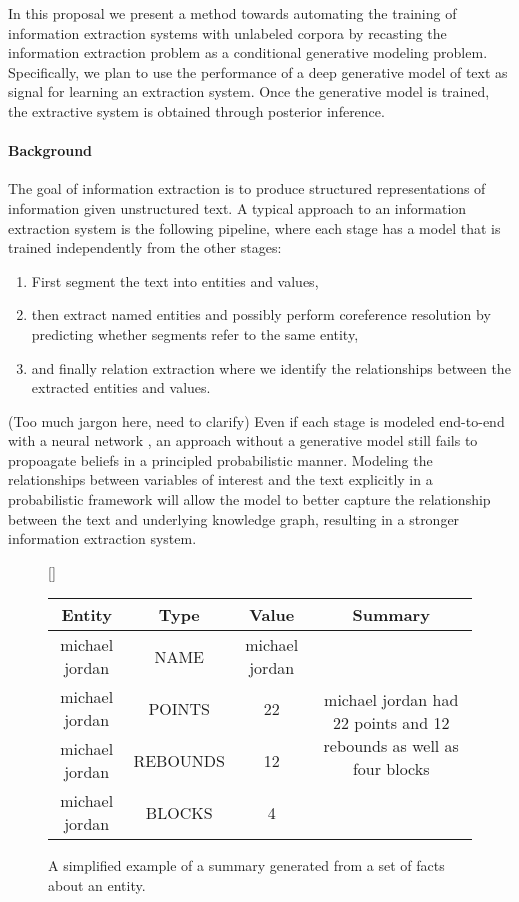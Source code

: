 \documentclass[12pt]{article}
\begin{document}
In this proposal we present a method towards automating the
training of information extraction systems with unlabeled corpora
by recasting the information extraction problem as a conditional generative modeling problem.
Specifically, we plan to use the performance of a deep generative model of text 
as signal for learning an extraction system.
Once the generative model is trained, the extractive system is obtained through posterior inference.

\paragraph{Background}
The goal of information extraction is to produce structured representations of information
given unstructured text.
A typical approach to an information extraction system is the following pipeline,
where each stage has a model that is trained independently from the other stages:
\begin{enumerate}
\item First segment the text into entities and values,
\item then extract named entities and possibly perform
coreference resolution by predicting whether segments refer to the same entity, 
\item and finally relation extraction where we identify the relationships between the extracted
entities and values.
\end{enumerate}
(Too much jargon here, need to clarify)
Even if each stage is modeled end-to-end with a neural network \citep{miwa2016e2ere},
an approach without a generative model still fails to propoagate beliefs
in a principled probabilistic manner.
Modeling the relationships between variables of interest and the text explicitly in a probabilistic framework
will allow the model to better capture
the relationship between the text and underlying knowledge graph,
resulting in a stronger information extraction system.

\begin{figure}[t]
\centering
{}[\FBwidth]
{\caption{A simplified example of a summary generated from a set of facts about an entity.}
\label{fig:boxscore}}
{\small\begin{tabular}{ccc|c}
\toprule
Entity & Type & Value & Summary\\
\midrule
michael jordan & NAME & michael jordan &
\multirow{4}{*}{\parbox{4cm}{michael jordan had 22 points and 12 rebounds as well as four blocks}}\\
michael jordan & POINTS & 22 &\\
michael jordan & REBOUNDS & 12 & \\
michael jordan & BLOCKS & 4 &\\
\bottomrule
\end{tabular}}
\end{figure}
\end{document}
